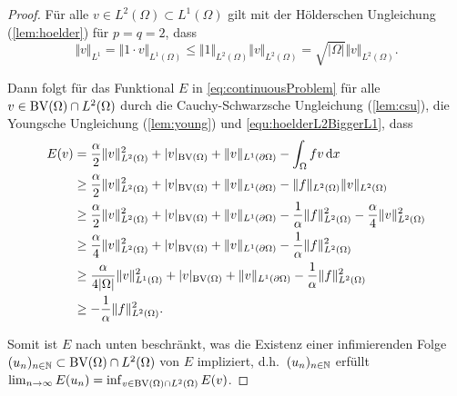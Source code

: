 \begin{proof}
  Für alle $v\in L^2(\Omega)\subset L^1(\Omega)$ gilt mit der Hölderschen
  Ungleichung
  (\cref{lem:hoelder}) für $p=q=2$, dass
  \begin{equation}\label{equ:hoelderL2BiggerL1}
    \Vert v\Vert_{L^1} 
    = \Vert 1\cdot v\Vert_{L^1(\Omega)}
    \leq \Vert 1\Vert_{L^2(\Omega)}\Vert v\Vert_{L^2(\Omega)}
    =\sqrt{|\Omega|} \Vert v\Vert_{L^2(\Omega)}.
  \end{equation}

  Dann folgt für das Funktional $E$ in \eqref{eq:continuousProblem}
  für alle $v\in \textup{BV}(\Omega)\cap L^2(\Omega)$ durch die
  Cauchy-Schwarzsche Ungleichung (\cref{lem:csu}), die Youngsche
  Ungleichung (\cref{lem:young}) und \cref{equ:hoelderL2BiggerL1}, dass
  \begin{equation}
    \label{eq:contProbBddFromBelow}
    \begin{aligned}
      E(v)&=\frac{\alpha}{2}\Vert v\Vert_{L^2(\Omega)}^2 + |v|_{\textup{BV}(\Omega)}
      +\Vert v\Vert_{L^1(\partial\Omega)}-\int_\Omega fv\,\mathrm{d}x\\
      &\geq 
      \frac{\alpha}{2}\Vert v\Vert_{L^2(\Omega)}^2 + |v|_{\textup{BV}(\Omega)}
      +\Vert v\Vert_{L^1(\partial\Omega)}
      -\Vert f\Vert_{L^2(\Omega)}\Vert v\Vert_{L^2(\Omega)}\\
      &\geq 
      \frac{\alpha}{2}\Vert v\Vert_{L^2(\Omega)}^2 + |v|_{\textup{BV}(\Omega)}
      +\Vert v\Vert_{L^1(\partial\Omega)}
      -\frac{1}{\alpha}\Vert f\Vert_{L^2(\Omega)}^2
      -\frac{\alpha}{4}\Vert v\Vert_{L^2(\Omega)}^2\\
      &\geq 
      \frac{\alpha}{4}\Vert v\Vert_{L^2(\Omega)}^2 + |v|_{\textup{BV}(\Omega)}
      +\Vert v\Vert_{L^1(\partial\Omega)}-\frac{1}{\alpha}\Vert
      f\Vert_{L^2(\Omega)}^2\\
      &\geq 
      \frac{\alpha}{4|\Omega|}\Vert v\Vert_{L^1(\Omega)}^2 + |v|_{\textup{BV}(\Omega)}
      +\Vert v\Vert_{L^1(\partial\Omega)}-\frac{1}{\alpha}\Vert
      f\Vert_{L^2(\Omega)}^2\\
      &\geq -\frac{1}{\alpha}\Vert f\Vert_{L^2(\Omega)}^2.
    \end{aligned}
  \end{equation}

  Somit ist $E$ nach unten beschränkt, was die Existenz einer infimierenden
  Folge $(u_n)_{n\in\mathbb{N}}\subset\textup{BV}(\Omega)\cap L^2(\Omega)$ von $E$ 
  impliziert, d.h.\
  $(u_n)_{n\in\mathbb{N}}$ erfüllt $\lim_{n\rightarrow\infty}E(u_n) =
  \inf_{v\in\textup{BV}(\Omega)\cap L^2(\Omega)}E(v)$. 


\end{proof}
